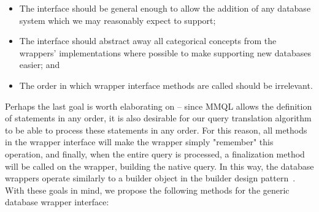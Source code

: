 \begin{itemize}
    \item The interface should be general enough to allow the addition of any database system which we may reasonably expect to support;
    \item The interface should abstract away all categorical concepts from the wrappers' implementations where possible to make supporting new databases easier; and
    \item The order in which wrapper interface methods are called should be irrelevant.
\end{itemize}

Perhaps the last goal is worth elaborating on -- since MMQL allows the definition of statements in any order, it is also desirable for our query translation algorithm to be able to process these statements in any order.
For this reason, all methods in the wrapper interface will make the wrapper simply "remember" this operation, and finally, when the entire query is processed, a finalization method will be called on the wrapper, building the native query.
In this way, the database wrappers operate similarly to a builder object in the builder design pattern~\cite{gof}.
With these goals in mind, we propose the following methods for the generic database wrapper interface:

